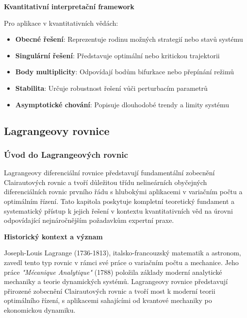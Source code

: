 \vspace{1\baselineskip}

\noindent\textbf{Kvantitativní interpretační framework}

Pro aplikace v kvantitativních vědách:
\begin{itemize}
\item \textbf{Obecné řešení}: Reprezentuje rodinu možných strategií nebo stavů systému
\item \textbf{Singulární řešení}: Představuje optimální nebo kritickou trajektorii
\item \textbf{Body multiplicity}: Odpovídají bodům bifurkace nebo přepínání režimů
\item \textbf{Stabilita}: Určuje robustnost řešení vůči perturbacím parametrů
\item \textbf{Asymptotické chování}: Popisuje dlouhodobé trendy a limity systému
\end{itemize}

\subsection{Lagrangeovy rovnice}
\label{subsec:lagrangeovy-rovnice}

\subsubsection{Úvod do Lagrangeových rovnic}
\label{subsubsec:úvod-lagrange}

Lagrangeovy diferenciální rovnice představují fundamentální zobecnění Clairautových rovnic a tvoří důležitou třídu nelineárních obyčejných diferenciálních rovnic prvního řádu s hlubokými aplikacemi v variačním počtu a optimálním řízení. Tato kapitola poskytuje kompletní teoretický fundament a systematický přístup k jejich řešení v kontextu kvantitativních věd na úrovni odpovídající nejnáročnějším požadavkům expertní praxe.

\vspace{1\baselineskip}

\noindent\textbf{Historický kontext a význam}

Joseph-Louis Lagrange (1736-1813), italsko-francouzský matematik a astronom, zavedl tento typ rovnic v rámci své práce o variačním počtu a mechanice. Jeho práce \textit{"Mécanique Analytique"} (1788) položila základy moderní analytické mechaniky a teorie dynamických systémů. Lagrangeovy rovnice představují přirozené zobecnění Clairautových rovnic a tvoří most k moderní teorii optimálního řízení, s aplikacemi sahajícími od kvantové mechaniky po ekonomickou dynamiku.


